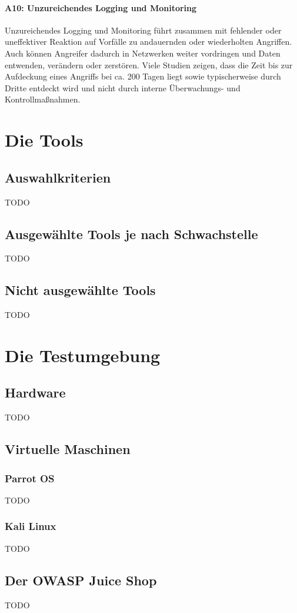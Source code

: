 \documentclass[12pt,oneside,a4paper,parskip]{scrbook}
\begin{document}
    \subsubsection{A10: Unzureichendes Logging und Monitoring}
    Unzureichendes Logging und Monitoring führt zusammen mit fehlender oder uneffektiver Reaktion auf Vorfälle zu andauernden oder wiederholten Angriffen. Auch können Angreifer dadurch in Netzwerken weiter vordringen und Daten entwenden, verändern oder zerstören. Viele Studien zeigen, dass die Zeit bis zur Aufdeckung eines Angriffs bei ca. 200 Tagen liegt sowie typischerweise durch Dritte entdeckt wird und nicht durch interne Überwachungs- und Kontrollmaßnahmen.

\cite{OWASPtop10}

\chapter{Die Tools}
  \section{Auswahlkriterien}
  TODO
  \section{Ausgewählte Tools je nach Schwachstelle}
  TODO
  \section{Nicht ausgewählte Tools}
  TODO

\chapter{Die Testumgebung}
  \section{Hardware}
  TODO
  \section{Virtuelle Maschinen}
    \subsection{Parrot OS}
    TODO
    \subsection{Kali Linux}
    TODO
  \section{Der OWASP Juice Shop}
  TODO
\end{document}
